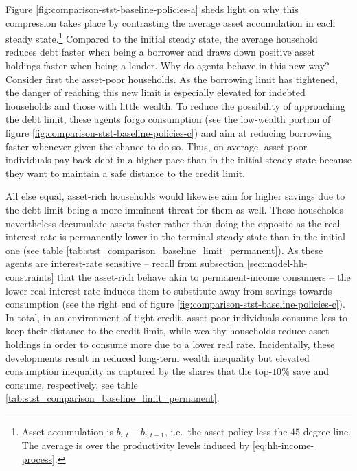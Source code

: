 \documentclass[a4paper,12pt]{article} %
\numberwithin{equation}{section} %
\numberwithin{figure}{section}
\numberwithin{table}{section}
\begin{document}
Figure \ref{fig:comparison-stst-baseline-policies-a} sheds light on why this compression takes place by contrasting the average asset accumulation in each steady state.\footnote{Asset accumulation is $b_{i,t} - b_{i,t-1}$, i.e.~the asset policy less the $45$ degree line. The average is over the productivity levels induced by \eqref{eq:hh-income-process}.} Compared to the initial steady state, the average household reduces debt faster when being a borrower and draws down positive asset holdings faster when being a lender. Why do agents behave in this new way? Consider first the asset-poor households. As the borrowing limit has tightened, the danger of reaching this new limit is especially elevated for indebted households and those with little wealth. To reduce the possibility of approaching the debt limit, these agents forgo consumption (see the low-wealth portion of figure \ref{fig:comparison-stst-baseline-policies-c}) and aim at reducing borrowing faster whenever given the chance to do so. Thus, on average, asset-poor individuals pay back debt in a higher pace than in the initial steady state because they want to maintain a safe distance to the credit limit.

All else equal, asset-rich households would likewise aim for higher savings due to the debt limit being a more imminent threat for them as well. These households nevertheless decumulate assets faster rather than doing the opposite as the real interest rate is permanently lower in the terminal steady state than in the initial one (see table \ref{tab:stst_comparison_baseline_limit_permanent}). As these agents are interest-rate sensitive -- recall from subsection \ref{sec:model-hh-constraints} that the asset-rich behave akin to permanent-income consumers -- the lower real interest rate induces them to substitute away from savings towards consumption (see the right end of figure \ref{fig:comparison-stst-baseline-policies-c}). In total, in an environment of tight credit, asset-poor individuals consume less to keep their distance to the credit limit, while wealthy households reduce asset holdings in order to consume more due to a lower real rate. Incidentally, these developments result in reduced long-term wealth inequality but elevated consumption inequality as captured by the shares that the top-$10\%$ save and consume, respectively, see table \ref{tab:stst_comparison_baseline_limit_permanent}.
\end{document}
